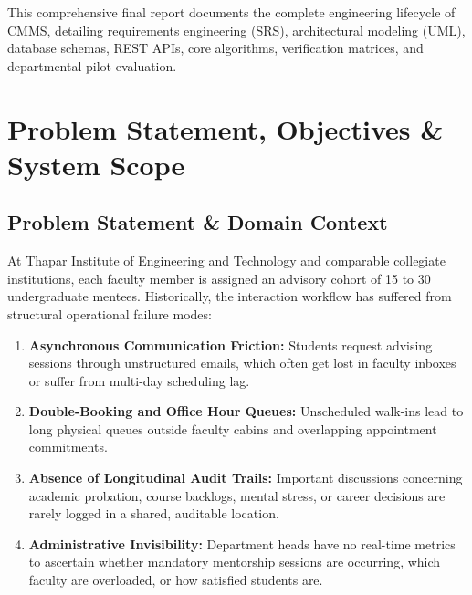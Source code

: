 \documentclass[11pt,a4paper]{article}
\begin{document}
This comprehensive final report documents the complete engineering lifecycle of CMMS, detailing requirements engineering (SRS), architectural modeling (UML), database schemas, REST APIs, core algorithms, verification matrices, and departmental pilot evaluation.

\section{Problem Statement, Objectives \& System Scope}

\subsection{Problem Statement \& Domain Context}
At Thapar Institute of Engineering and Technology and comparable collegiate institutions, each faculty member is assigned an advisory cohort of 15 to 30 undergraduate mentees. Historically, the interaction workflow has suffered from structural operational failure modes:
\begin{enumerate}[leftmargin=1.4em, itemsep=0.2em]
  \item \textbf{Asynchronous Communication Friction:} Students request advising sessions through unstructured emails, which often get lost in faculty inboxes or suffer from multi-day scheduling lag.
  \item \textbf{Double-Booking and Office Hour Queues:} Unscheduled walk-ins lead to long physical queues outside faculty cabins and overlapping appointment commitments.
  \item \textbf{Absence of Longitudinal Audit Trails:} Important discussions concerning academic probation, course backlogs, mental stress, or career decisions are rarely logged in a shared, auditable location.
  \item \textbf{Administrative Invisibility:} Department heads have no real-time metrics to ascertain whether mandatory mentorship sessions are occurring, which faculty are overloaded, or how satisfied students are.
\end{enumerate}
\end{document}
